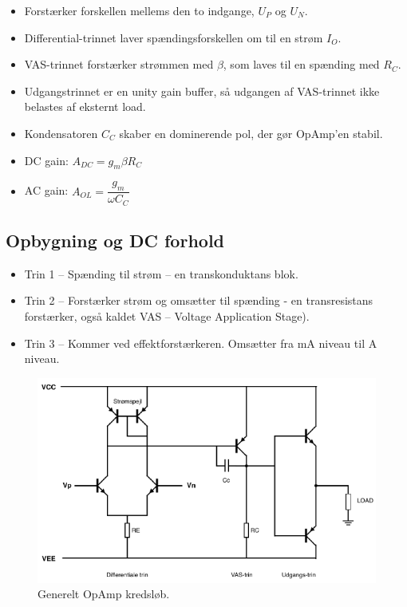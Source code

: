 \documentclass[danish]{article}
\begin{document}
\begin{itemize}
	\item Forstærker forskellen mellems den to indgange, $U_P$ og $U_N$.
	\item Differential-trinnet laver spændingsforskellen om til en strøm $I_O$.
	\item VAS-trinnet forstærker strømmen med $\beta$, som laves til en spænding med $R_C$.
	\item Udgangstrinnet er en unity gain buffer, så udgangen af VAS-trinnet ikke belastes af eksternt load.
	\item Kondensatoren $C_C$ skaber en dominerende pol, der gør OpAmp’en stabil.
	\item DC gain: $A_{DC} = g_m \beta R_C$
	\item AC gain: $A_{OL} = \dfrac{g_m}{\omega C_C}$
\end{itemize}
\newpage 
\subsection{Opbygning og DC forhold}
\begin{itemize}
	\item Trin 1 – Spænding til strøm – en transkonduktans blok.
	\item Trin 2 – Forstærker strøm og omsætter til spænding - en transresistans forstærker, også kaldet VAS – Voltage Application Stage).
	\item Trin 3 – Kommer ved effektforstærkeren. Omsætter fra mA niveau til A niveau.
\end{itemize}

\begin{figure} [H]
	\centering
	\includegraphics[width=\linewidth]{graphics/opamp}
	\caption{Generelt OpAmp kredsløb.}
	\label{fig:opamp}
\end{figure}
\newpage 
\end{document}
